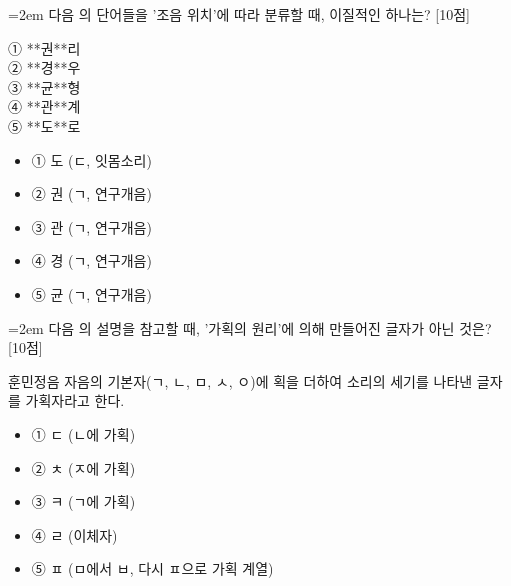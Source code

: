\documentclass[11pt,a4paper]{article}
\newcommand{\qnum}[1]{%
  \tikz[baseline=(num.base)]{%
    \node[circle, fill=numCircle, text=white, inner sep=0pt,
          minimum size=18pt, font=\small\bfseries] (num) {#1};%
  }%
}
\newcommand{\pts}[1]{%
  \hfill\textcolor{ptsBadge}{[#1점]}%
}
\begin{document}
\vspace{4mm}
\begin{minipage}{\columnwidth}
{\hangindent=2em
\qnum{28}\enspace 다음 의 단어들을 '조음 위치'에 따라 분류할 때, 이질적인 하나는? \pts{10}
\par}

\vspace{3mm}
\begin{tcolorbox}[bogi]
① **권**리 \\{}
② **경**우 \\{}
③ **균**형 \\{}
④ **관**계 \\{}
⑤ **도**로
\end{tcolorbox}
\vspace{3mm}
\begin{itemize}[leftmargin=2.5em, labelsep=0.3em, label={}, itemsep=4pt, parsep=1pt, topsep=0pt]
  \item ① 도 (ㄷ, 잇몸소리)
  \item ② 권 (ㄱ, 연구개음)
  \item ③ 관 (ㄱ, 연구개음)
  \item ④ 경 (ㄱ, 연구개음)
  \item ⑤ 균 (ㄱ, 연구개음)
\end{itemize}
\end{minipage}
\vspace{4mm}

\vspace{4mm}
\begin{minipage}{\columnwidth}
{\hangindent=2em
\qnum{29}\enspace 다음 의 설명을 참고할 때, '가획의 원리'에 의해 만들어진 글자가 아닌 것은? \pts{10}
\par}

\vspace{3mm}
\begin{tcolorbox}[bogi]
훈민정음 자음의 기본자(ㄱ, ㄴ, ㅁ, ㅅ, ㅇ)에 획을 더하여 소리의 세기를 나타낸 글자를 가획자라고 한다.
\end{tcolorbox}
\vspace{3mm}
\begin{itemize}[leftmargin=2.5em, labelsep=0.3em, label={}, itemsep=4pt, parsep=1pt, topsep=0pt]
  \item ① ㄷ (ㄴ에 가획)
  \item ② ㅊ (ㅈ에 가획)
  \item ③ ㅋ (ㄱ에 가획)
  \item ④ ㄹ (이체자)
  \item ⑤ ㅍ (ㅁ에서 ㅂ, 다시 ㅍ으로 가획 계열)
\end{itemize}
\end{minipage}
\vspace{4mm}
\end{document}
